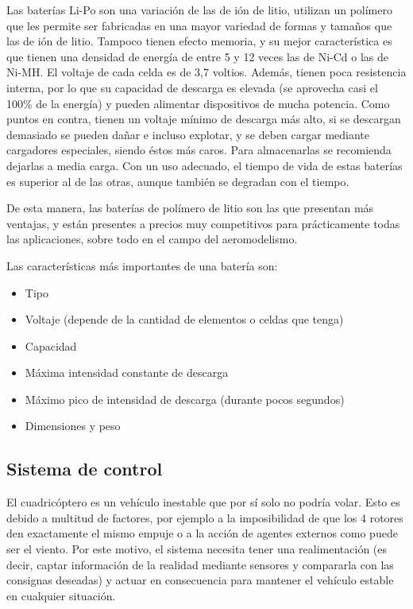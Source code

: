 \documentclass[12pt,twoside]{article}
\begin{document}
\begin{itemize}
Las baterías Li-Po son una variación de las de ión de litio, utilizan un polímero que les permite ser fabricadas en una mayor variedad de formas y tamaños que las de ión de litio. Tampoco tienen efecto memoria, y su mejor característica es que tienen una densidad de energía de entre 5 y 12 veces las de Ni-Cd o las de Ni-MH. El voltaje de cada celda es de 3,7 voltios. Además, tienen poca resistencia interna, por lo que su capacidad de descarga es elevada (se aprovecha casi el 100\% de la energía) y pueden alimentar dispositivos de mucha potencia. Como puntos en contra, tienen un voltaje mínimo de descarga más alto, si se descargan demasiado se pueden dañar e incluso explotar, y se deben cargar mediante cargadores especiales, siendo éstos más caros. Para almacenarlas se recomienda dejarlas a media carga. Con un uso adecuado, el tiempo de vida de estas baterías es superior al de las otras, aunque también se degradan con el tiempo. 
		\end{itemize}
		
De esta manera, las baterías de polímero de litio son las que presentan más ventajas, y están presentes a precios muy competitivos para prácticamente todas las aplicaciones, sobre todo en el campo del aeromodelismo.

Las características más importantes de una batería son:
		\begin{itemize}
			\item Tipo
			\item Voltaje (depende de la cantidad de elementos o celdas que tenga)
			\item Capacidad
			\item Máxima intensidad constante de descarga
			\item Máximo pico de intensidad de descarga (durante pocos segundos)
			\item Dimensiones y peso
		\end{itemize}


		\subsection{Sistema de control}\label{subsec:control}

			El cuadricóptero es un vehículo inestable que por sí solo no podría volar. Esto es debido a multitud de factores, por ejemplo a la imposibilidad de que los 4 rotores den exactamente el mismo empuje o a la acción de agentes externos como puede ser el viento. Por este motivo, el sistema necesita tener una realimentación (es decir, captar información de la realidad mediante sensores y compararla con las consignas deseadas) y actuar en consecuencia para mantener el vehículo estable en cualquier situación. 
\end{document}
